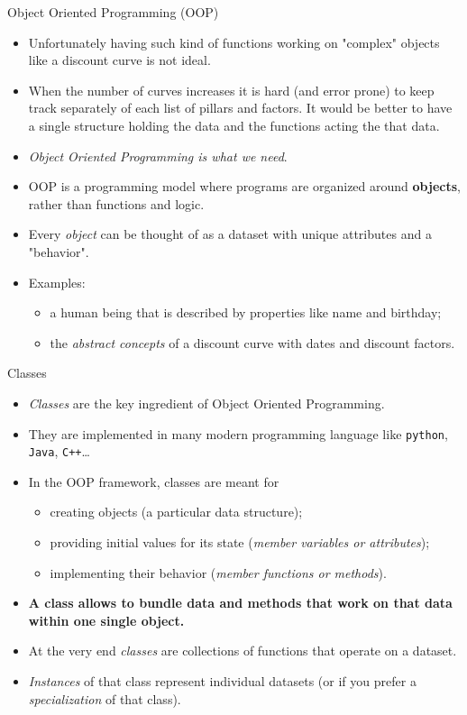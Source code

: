 \documentclass{beamer}
\begin{document}
\begin{frame}{Object Oriented Programming (OOP)}
  \begin{itemize}
  \item Unfortunately having such kind of functions working on "complex" objects like a discount curve is not ideal.
  \item When the number of curves increases it is hard (and error prone) to keep track separately of each list of pillars and factors. It would be better to have a single structure holding the data and the functions acting the that data. 
  \item \emph{Object Oriented Programming is what we need}.
  \item OOP is a programming model where programs are organized around \textbf{objects}, rather than functions and logic.
  \item Every \emph{object} can be thought of as a dataset with unique attributes and a "behavior".
  \item Examples:
    \begin{itemize}
    \item a human being that is described by properties like name and birthday;
    \item the \emph{abstract concepts} of a discount curve with dates and discount factors.
    \end{itemize}
  \end{itemize}
\end{frame}

\begin{frame}{Classes}
  \begin{itemize}
  \item \emph{Classes} are the key ingredient of Object Oriented Programming.
  \item They are implemented in many modern programming language like \texttt{python}, \texttt{Java}, \texttt{C++}\ldots
  \item In the OOP framework, classes are meant for
    \begin{itemize}
    \item creating objects (a particular data structure);
    \item providing initial values for its state (\emph{member variables or attributes});
    \item implementing their behavior (\emph{member functions or methods}).
    \end{itemize}
  \item \textbf{A class allows to bundle data and methods that work on that data within one single object.}
  \item At the very end \emph{classes} are collections of functions that operate on a dataset. 
  \item \emph{Instances} of that class represent individual datasets (or if you prefer a \emph{specialization} of that class).
  \end{itemize}
\end{frame}
\end{document}
